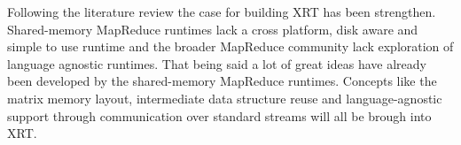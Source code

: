 \documentclass[11pt]{article}       %
\begin{document}
Following the literature review the case for building XRT has been strengthen.
Shared-memory MapReduce runtimes lack a cross platform, disk aware and simple to
use runtime and the broader MapReduce community lack exploration of language
agnostic runtimes. That being said a lot of great ideas have already been
developed by the shared-memory MapReduce runtimes. Concepts like the matrix
memory layout, intermediate data structure reuse and language-agnostic support
through communication over standard streams will all be brough into XRT.



\end{document}
